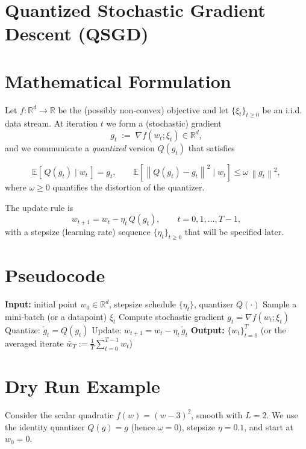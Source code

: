 \documentclass{article}
\newcommand{\EE}{\mathbb{E}}
\newcommand{\RR}{\mathbb{R}}
\newcommand{\norm}[1]{\left\lVert#1\right\rVert}
\begin{document}
\section*{Quantized Stochastic Gradient Descent (QSGD)}

\section*{Mathematical Formulation}
Let $f:\RR^{d}\rightarrow\RR$ be the (possibly non‑convex) objective and let $\{\xi_t\}_{t\ge0}$ be an i.i.d. data stream.
At iteration $t$ we form a (stochastic) gradient
\[
g_t \;:=\; \nabla f(w_t;\xi_t)\in\RR^{d},
\]
and we communicate a \emph{quantized} version $Q(g_t)$ that satisfies  

\[
\boxed{\EE\!\left[\,Q(g_t)\mid w_t\,\right]=g_t},\qquad 
\boxed{\EE\!\left[\norm{Q(g_t)-g_t}^{2}\mid w_t\right]\le \omega\,\norm{g_t}^{2}},
\tag{1}
\]
where $\omega\ge0$ quantifies the distortion of the quantizer.

The update rule is
\[
\boxed{w_{t+1}=w_t-\eta_t\,Q(g_t)},\qquad t=0,1,\dots,T-1,
\tag{2}
\]
with a stepsize (learning rate) sequence $\{\eta_t\}_{t\ge0}$ that will be specified later.

\section*{Pseudocode}
\begin{algorithm}[H]
\caption{Quantized Stochastic Gradient Descent (QSGD)}
\begin{algorithmic}[1]
\State \textbf{Input:} initial point $w_0\in\RR^{d}$, stepsize schedule $\{\eta_t\}$, quantizer $Q(\cdot)$
    \State Sample a mini‑batch (or a datapoint) $\xi_t$
    \State Compute stochastic gradient $g_t=\nabla f(w_t;\xi_t)$
    \State Quantize: $\tilde g_t = Q(g_t)$   
    \State Update: $w_{t+1}=w_t-\eta_t\,\tilde g_t$   
\EndFor
\State \textbf{Output:} $\{w_t\}_{t=0}^{T}$ (or the averaged iterate $\bar w_T:=\tfrac1T\sum_{t=0}^{T-1}w_t$)
\end{algorithmic}
\end{algorithm}

\section*{Dry Run Example}
Consider the scalar quadratic $f(w)=(w-3)^{2}$, smooth with $L=2$.
We use the identity quantizer $Q(g)=g$ (hence $\omega=0$), stepsize $\eta=0.1$, and start at $w_0=0$.
\end{document}
